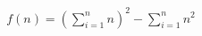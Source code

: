 \documentclass{article}
\begin{document}
\begin{align*}
    f(n) = \left( \sum_{i = 1}^{n}{n} \right)^{2} - \sum_{i = 1}^{n}{n^{2}}
\end{align*}
\end{document}
